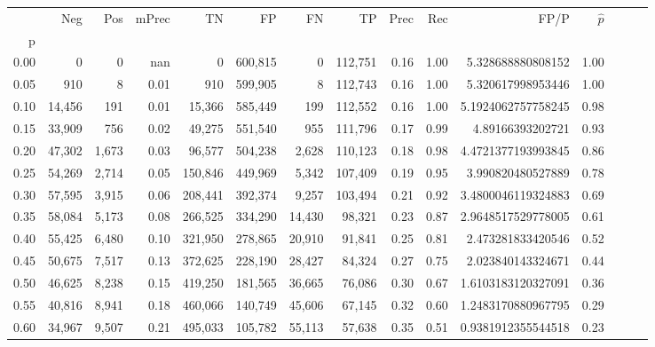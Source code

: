 \begin{tabular}{rrrrrrrrrrrrrrr}
\toprule
{} &     Neg &    Pos & mPrec &       TN &       FP &       FN &       TP &  Prec &   Rec &                  FP/P & $\hat{p}$ \\
p    &         &        &       &          &          &          &          &       &       &                       &           \\
\midrule
0.00 &       0 &      0 &   nan &        0 &  600,815 &        0 &  112,751 &  0.16 &  1.00 &     5.328688880808152 &      1.00 \\
0.05 &     910 &      8 &  0.01 &      910 &  599,905 &        8 &  112,743 &  0.16 &  1.00 &     5.320617998953446 &      1.00 \\
0.10 &  14,456 &    191 &  0.01 &   15,366 &  585,449 &      199 &  112,552 &  0.16 &  1.00 &    5.1924062757758245 &      0.98 \\
0.15 &  33,909 &    756 &  0.02 &   49,275 &  551,540 &      955 &  111,796 &  0.17 &  0.99 &      4.89166393202721 &      0.93 \\
0.20 &  47,302 &  1,673 &  0.03 &   96,577 &  504,238 &    2,628 &  110,123 &  0.18 &  0.98 &    4.4721377193993845 &      0.86 \\
0.25 &  54,269 &  2,714 &  0.05 &  150,846 &  449,969 &    5,342 &  107,409 &  0.19 &  0.95 &     3.990820480527889 &      0.78 \\
0.30 &  57,595 &  3,915 &  0.06 &  208,441 &  392,374 &    9,257 &  103,494 &  0.21 &  0.92 &    3.4800046119324883 &      0.69 \\
0.35 &  58,084 &  5,173 &  0.08 &  266,525 &  334,290 &   14,430 &   98,321 &  0.23 &  0.87 &    2.9648517529778005 &      0.61 \\
0.40 &  55,425 &  6,480 &  0.10 &  321,950 &  278,865 &   20,910 &   91,841 &  0.25 &  0.81 &     2.473281833420546 &      0.52 \\
0.45 &  50,675 &  7,517 &  0.13 &  372,625 &  228,190 &   28,427 &   84,324 &  0.27 &  0.75 &     2.023840143324671 &      0.44 \\
0.50 &  46,625 &  8,238 &  0.15 &  419,250 &  181,565 &   36,665 &   76,086 &  0.30 &  0.67 &    1.6103183120327091 &      0.36 \\
0.55 &  40,816 &  8,941 &  0.18 &  460,066 &  140,749 &   45,606 &   67,145 &  0.32 &  0.60 &    1.2483170880967795 &      0.29 \\
0.60 &  34,967 &  9,507 &  0.21 &  495,033 &  105,782 &   55,113 &   57,638 &  0.35 &  0.51 &    0.9381912355544518 &      0.23 \\

\end{tabular}
